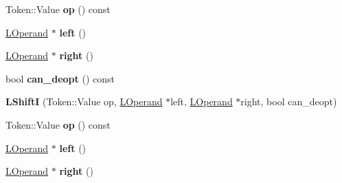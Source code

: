 \begin{DoxyCompactItemize}
\item 
Token\+::\+Value {\bfseries op} () const \hypertarget{classv8_1_1internal_1_1_l_shift_i_af3e3cecd04a31cf7df5a66653f6c009d}{}\label{classv8_1_1internal_1_1_l_shift_i_af3e3cecd04a31cf7df5a66653f6c009d}

\item 
\hyperlink{classv8_1_1internal_1_1_l_operand}{L\+Operand} $\ast$ {\bfseries left} ()\hypertarget{classv8_1_1internal_1_1_l_shift_i_a5ef728d134ab0ae5565b90793364add0}{}\label{classv8_1_1internal_1_1_l_shift_i_a5ef728d134ab0ae5565b90793364add0}

\item 
\hyperlink{classv8_1_1internal_1_1_l_operand}{L\+Operand} $\ast$ {\bfseries right} ()\hypertarget{classv8_1_1internal_1_1_l_shift_i_a728880e17b20375b612e631dcc13dc3e}{}\label{classv8_1_1internal_1_1_l_shift_i_a728880e17b20375b612e631dcc13dc3e}

\item 
bool {\bfseries can\+\_\+deopt} () const \hypertarget{classv8_1_1internal_1_1_l_shift_i_abbbf228b7c1516e1e419ef9ffbcc97b6}{}\label{classv8_1_1internal_1_1_l_shift_i_abbbf228b7c1516e1e419ef9ffbcc97b6}

\item 
{\bfseries L\+ShiftI} (Token\+::\+Value op, \hyperlink{classv8_1_1internal_1_1_l_operand}{L\+Operand} $\ast$left, \hyperlink{classv8_1_1internal_1_1_l_operand}{L\+Operand} $\ast$right, bool can\+\_\+deopt)\hypertarget{classv8_1_1internal_1_1_l_shift_i_adaac229c54d2a924ac68d595fc30703a}{}\label{classv8_1_1internal_1_1_l_shift_i_adaac229c54d2a924ac68d595fc30703a}

\item 
Token\+::\+Value {\bfseries op} () const \hypertarget{classv8_1_1internal_1_1_l_shift_i_af3e3cecd04a31cf7df5a66653f6c009d}{}\label{classv8_1_1internal_1_1_l_shift_i_af3e3cecd04a31cf7df5a66653f6c009d}

\item 
\hyperlink{classv8_1_1internal_1_1_l_operand}{L\+Operand} $\ast$ {\bfseries left} ()\hypertarget{classv8_1_1internal_1_1_l_shift_i_a5ef728d134ab0ae5565b90793364add0}{}\label{classv8_1_1internal_1_1_l_shift_i_a5ef728d134ab0ae5565b90793364add0}

\item 
\hyperlink{classv8_1_1internal_1_1_l_operand}{L\+Operand} $\ast$ {\bfseries right} ()\hypertarget{classv8_1_1internal_1_1_l_shift_i_a728880e17b20375b612e631dcc13dc3e}{}\label{classv8_1_1internal_1_1_l_shift_i_a728880e17b20375b612e631dcc13dc3e}


\end{DoxyCompactItemize}
